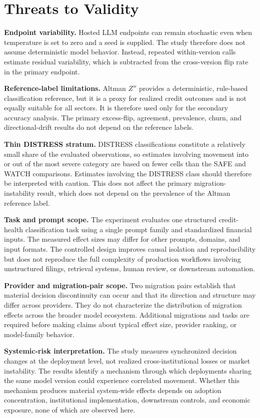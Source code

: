 \documentclass{ieeeaccess}
\begin{document}
\section{Threats to Validity}
\noindent\textbf{Endpoint variability.} Hosted LLM endpoints can remain stochastic even when temperature is set to zero and a seed is supplied. The study therefore does not assume deterministic model behavior. Instead, repeated within-version calls estimate residual variability, which is subtracted from the cross-version flip rate in the primary endpoint.

\noindent\textbf{Reference-label limitations.} Altman $Z''$ provides a deterministic, rule-based classification reference, but it is a proxy for realized credit outcomes and is not equally suitable for all sectors. It is therefore used only for the secondary accuracy analysis. The primary excess-flip, agreement, prevalence, churn, and directional-drift results do not depend on the reference labels.

\noindent\textbf{Thin DISTRESS stratum.} DISTRESS classifications constitute a relatively small share of the evaluated observations, so estimates involving movement into or out of the most severe category are based on fewer cells than the SAFE and WATCH comparisons. Estimates involving the DISTRESS class should therefore be interpreted with caution. This does not affect the primary migration-instability result, which does not depend on the prevalence of the Altman reference label.

\noindent\textbf{Task and prompt scope.} The experiment evaluates one structured credit-health classification task using a single prompt family and standardized financial inputs. The measured effect sizes may differ for other prompts, domains, and input formats. The controlled design improves causal isolation and reproducibility but does not reproduce the full complexity of production workflows involving unstructured filings, retrieval systems, human review, or downstream automation.

\noindent\textbf{Provider and migration-pair scope.} Two migration pairs establish that material decision discontinuity can occur and that its direction and structure may differ across providers. They do not characterize the distribution of migration effects across the broader model ecosystem. Additional migrations and tasks are required before making claims about typical effect size, provider ranking, or model-family behavior.

\noindent\textbf{Systemic-risk interpretation.} The study measures synchronized decision changes at the deployment level, not realized cross-institutional losses or market instability. The results identify a mechanism through which deployments sharing the same model version could experience correlated movement. Whether this mechanism produces material system-wide effects depends on adoption concentration, institutional implementation, downstream controls, and economic exposure, none of which are observed here.
\end{document}
